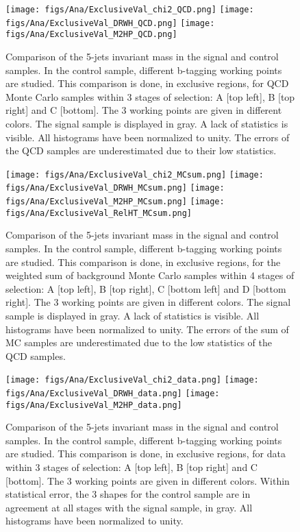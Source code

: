 \begin{figure}[!Hhtbp]
  \begin{center}
    \texttt{[image: figs/Ana/ExclusiveVal\_chi2\_QCD.png]}
    \texttt{[image: figs/Ana/ExclusiveVal\_DRWH\_QCD.png]}
    \texttt{[image: figs/Ana/ExclusiveVal\_M2HP\_QCD.png]}
    \caption{Comparison of the 5-jets invariant mass in the signal and control samples. In the control sample, different b-tagging working points are studied. This comparison is done, in exclusive regions, for QCD Monte Carlo samples within 3 stages of selection: A [top left], B [top right] and C [bottom]. The 3 working points are given in different colors. The signal sample is displayed in gray. A lack of statistics is visible. All histograms have been normalized to unity. The errors of the QCD samples are underestimated due to their low statistics. }
    \label{fig:StageExWPQCD}
  \end{center}
\end{figure}

\begin{figure}[!Hhtbp]
  \begin{center}
    \texttt{[image: figs/Ana/ExclusiveVal\_chi2\_MCsum.png]}
    \texttt{[image: figs/Ana/ExclusiveVal\_DRWH\_MCsum.png]}
    \texttt{[image: figs/Ana/ExclusiveVal\_M2HP\_MCsum.png]}
    \texttt{[image: figs/Ana/ExclusiveVal\_RelHT\_MCsum.png]}
    \caption{Comparison of the 5-jets invariant mass in the signal and control samples. In the control sample, different b-tagging working points are studied. This comparison is done, in exclusive regions, for the weighted sum of background Monte Carlo samples within 4 stages of selection: A [top left], B [top right], C [bottom left] and D [bottom right]. The 3 working points are given in different colors. The signal sample is displayed in gray. A lack of statistics is visible. All histograms have been normalized to unity. The errors of the sum of MC samples are underestimated due to the low statistics of the QCD samples.}
    \label{fig:StageExWPSum}
  \end{center}
\end{figure}

\begin{figure}[!Hhtbp]
  \begin{center}
    \texttt{[image: figs/Ana/ExclusiveVal\_chi2\_data.png]}
    \texttt{[image: figs/Ana/ExclusiveVal\_DRWH\_data.png]}
    \texttt{[image: figs/Ana/ExclusiveVal\_M2HP\_data.png]}
    \caption{Comparison of the 5-jets invariant mass in the signal and control samples. In the control sample, different b-tagging working points are studied. This comparison is done, in exclusive regions, for data within 3 stages of selection: A [top left], B [top right] and C [bottom]. The 3 working points are given in different colors. Within statistical error, the 3 shapes for the control sample are in agreement at all stages with the signal sample, in gray. All histograms have been normalized to unity.}
    \label{fig:StageExWPData}
  \end{center}
\end{figure}

